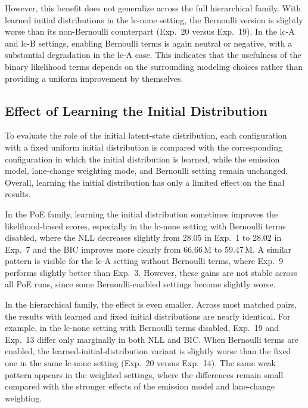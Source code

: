 \par However, this benefit does not generalize across the full hierarchical family.  
With learned initial distributions in the lc-none setting, the Bernoulli version is slightly worse than its non-Bernoulli counterpart (Exp.~20 versus Exp.~19). 
In the lc-A and lc-B settings, enabling Bernoulli terms is again neutral or negative, with a substantial degradation in the lc-A case. 
This indicates that the usefulness of the binary likelihood terms depends on the surrounding modeling choices rather than providing a uniform improvement by themselves.

\subsection{Effect of Learning the Initial Distribution}
To evaluate the role of the initial latent-state distribution, each configuration with a fixed uniform initial distribution is compared with the corresponding configuration 
in which the initial distribution is learned, while the emission model, lane-change weighting mode, and Bernoulli setting remain unchanged. 
Overall, learning the initial distribution has only a limited effect on the final results.

\par In the \ac{PoE} family, learning the initial distribution sometimes improves the likelihood-based scores, especially in the lc-none setting with Bernoulli terms disabled, 
where the \ac{NLL} decreases slightly from 28.05 in Exp.~1 to 28.02 in Exp.~7 and the \ac{BIC} improves more clearly from 66.66\,M to 59.47\,M. 
A similar pattern is visible for the lc-A setting without Bernoulli terms, where Exp.~9 performs slightly better than Exp.~3. 
However, these gains are not stable across all \ac{PoE} runs, since some Bernoulli-enabled settings become slightly worse.

\par In the hierarchical family, the effect is even smaller. 
Across most matched pairs, the results with learned and fixed initial distributions are nearly identical. 
For example, in the lc-none setting with Bernoulli terms disabled, Exp.~19 and Exp.~13 differ only marginally in both \ac{NLL} and \ac{BIC}. 
When Bernoulli terms are enabled, the learned-initial-distribution variant is slightly worse than the fixed one in the same lc-none setting (Exp.~20 versus Exp.~14). 
The same weak pattern appears in the weighted settings, where the differences remain small compared with the stronger effects of the emission model and lane-change weighting.

